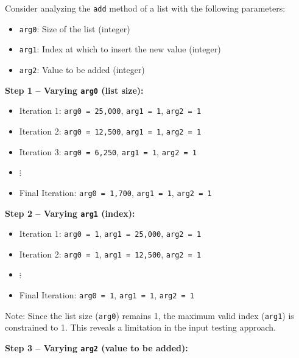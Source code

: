 \begin{tcolorbox}[
    title=Example 1: Input Testing Process for \texttt{List.add(index, Element)},
    colback=gray!5!white,
    colframe=gray!75!black,
    fonttitle=\bfseries,
    breakable,
    label={box:add-method-testing}
]

Consider analyzing the \texttt{add} method of a list with the following parameters:
\begin{itemize}
    \item \texttt{arg0}: Size of the list (integer)
    \item \texttt{arg1}: Index at which to insert the new value (integer)
    \item \texttt{arg2}: Value to be added (integer)
\end{itemize}

\textbf{Step 1 – Varying \texttt{arg0} (list size):}

\begin{itemize}
    \item Iteration 1: \texttt{arg0 = 25,000}, \texttt{arg1 = 1}, \texttt{arg2 = 1}
    \item Iteration 2: \texttt{arg0 = 12,500}, \texttt{arg1 = 1}, \texttt{arg2 = 1}
    \item Iteration 3: \texttt{arg0 = 6,250}, \texttt{arg1 = 1}, \texttt{arg2 = 1}
    \item $\vdots$
    \item Final Iteration: \texttt{arg0 = 1,700}, \texttt{arg1 = 1}, \texttt{arg2 = 1}
\end{itemize}

\textbf{Step 2 – Varying \texttt{arg1} (index):}

\begin{itemize}
    \item Iteration 1: \texttt{arg0 = 1}, \texttt{arg1 = 25,000}, \texttt{arg2 = 1}
    \item Iteration 2: \texttt{arg0 = 1}, \texttt{arg1 = 12,500}, \texttt{arg2 = 1}
    \item $\vdots$
    \item Final Iteration: \texttt{arg0 = 1}, \texttt{arg1 = 1}, \texttt{arg2 = 1}
\end{itemize}

{Note: Since the list size (\texttt{arg0}) remains 1, the maximum valid index (\texttt{arg1}) is constrained to 1. This reveals a limitation in the input testing approach.}

\textbf{Step 3 – Varying \texttt{arg2} (value to be added):}


\end{tcolorbox}
